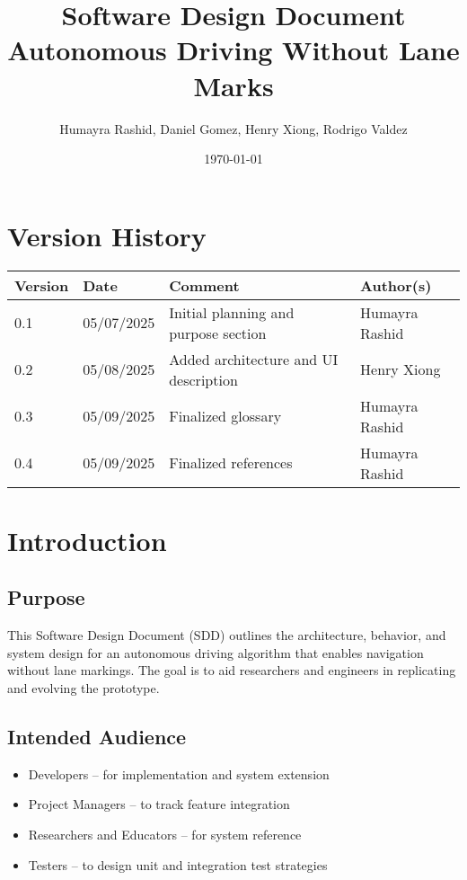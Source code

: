 \documentclass[12pt]{article}
\title{Software Design Document\\\large Autonomous Driving Without Lane Marks}
\author{Humayra Rashid, Daniel Gomez, Henry Xiong, Rodrigo Valdez}
\date{\today}
\begin{document}
\maketitle
\thispagestyle{empty}



\newpage

\tableofcontents
\newpage

\section*{Version History}
\begin{tabular}{|l|l|l|l|}
\hline
\textbf{Version} & \textbf{Date} & \textbf{Comment} & \textbf{Author(s)} \\
\hline
0.1 & 05/07/2025 & Initial planning and purpose section & Humayra Rashid \\
\hline
0.2 & 05/08/2025 & Added architecture and UI description & Henry Xiong \\
\hline
0.3 & 05/09/2025 & Finalized glossary & Humayra Rashid \\
\hline
0.4 & 05/09/2025 & Finalized references & Humayra Rashid \\
\hline
\end{tabular}

\newpage

\section{Introduction}
\subsection{Purpose}
This Software Design Document (SDD) outlines the architecture, behavior, and system design for an autonomous driving algorithm that enables navigation without lane markings. The goal is to aid researchers and engineers in replicating and evolving the prototype.

\subsection{Intended Audience}
\begin{itemize}
  \item Developers – for implementation and system extension
  \item Project Managers – to track feature integration
  \item Researchers and Educators – for system reference
  \item Testers – to design unit and integration test strategies
\end{itemize}
\end{document}
